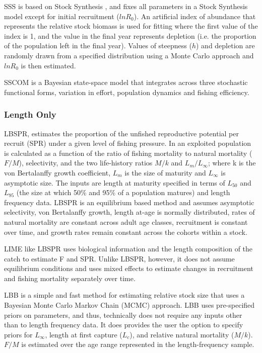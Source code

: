 SSS is based on Stock Synthesis  \citep{methot2013stock}, and fixes all parameters in a Stock Synthesis model except for initial recruitment ($lnR_0$). An artificial index of abundance that represents the relative stock biomass is used for fitting where the first value of the index is 1, and the value in the final year represents depletion (i.e. the proportion of the population left in the final year). Values of steepness ($h$) and depletion are randomly drawn from a specified distribution using a Monte Carlo approach and $lnR_0$ is then estimated. 

SSCOM is a Bayesian state-space model that integrates across three stochastic functional forms, variation in effort, population dynamics and fishing efficiency. 

\subsubsection*{Length Only}


LBSPR, estimates the proportion of the unfished reproductive potential per recruit  (SPR) under a given level of fishing pressure. In an exploited population is calculated as a function of the ratio of fishing mortality to natural mortality ($F/M$), selectivity, and the two life-history ratios $M/k$ and $L_m/L_{\infty}$; where k is the von Bertalanffy growth coefficient, $L_m$ is the size of maturity and $L_{\infty}$ is asymptotic size. The inputs are length at maturity specified in terms of $L_{50}$ and $L_{95}$ (the size at which 50\% and 95\% of a population matures) and length frequency data. LBSPR is an equilibrium based method and assumes asymptotic selectivity, von Bertalanffy growth, length at-age is normally distributed, rates of natural mortality are constant across adult age classes, recruitment is constant over time, and growth rates remain constant across the cohorts within a stock. 

LIME like LBSPR uses biological information and the length composition of the catch to estimate F and SPR. Unlike LBSPR, however, it does not assume equilibrium conditions and uses mixed effects to  estimate changes in recruitment and fishing mortality separately over time. 

LBB is a simple and fast method for estimating relative stock size that uses a Bayesian Monte Carlo Markov Chain (MCMC) approach. LBB uses pre-specified priors on parameters, and thus, technically does not require any inputs other than to length frequency data. It does provides the user the option to specify priors for $L_{\infty}$, length at first capture ($L_c$), and relative natural mortality ($M/k$). $F/M$ is estimated over the age range represented in the length-frequency sample. 


